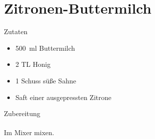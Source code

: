 \section*{Zitronen-Buttermilch}
\ihead{}\ohead{}
\cfoot{}
{\Large Zutaten}
\begin{multicols}{2}
\begin{itemize}
    \item \SI{500}{ml} Buttermilch
    \item \num{2} TL Honig
    \item \num{1} Schuss süße Sahne
    \item Saft einer ausgepressten Zitrone
\end{itemize}
\end{multicols}
\noindent
{\Large Zubereitung}\\
\\
Im Mixer mixen.
